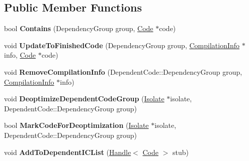 \subsection*{Public Member Functions}
\begin{DoxyCompactItemize}
\item 
\hypertarget{classv8_1_1internal_1_1_dependent_code_aef81cb78eaacbaad5015b73496506ce1}{}bool {\bfseries Contains} (Dependency\+Group group, \hyperlink{classv8_1_1internal_1_1_code}{Code} $\ast$code)\label{classv8_1_1internal_1_1_dependent_code_aef81cb78eaacbaad5015b73496506ce1}

\item 
\hypertarget{classv8_1_1internal_1_1_dependent_code_a6ca65e7e3557ddf9051ee09c0d70f3d8}{}void {\bfseries Update\+To\+Finished\+Code} (Dependency\+Group group, \hyperlink{classv8_1_1internal_1_1_compilation_info}{Compilation\+Info} $\ast$info, \hyperlink{classv8_1_1internal_1_1_code}{Code} $\ast$code)\label{classv8_1_1internal_1_1_dependent_code_a6ca65e7e3557ddf9051ee09c0d70f3d8}

\item 
\hypertarget{classv8_1_1internal_1_1_dependent_code_ad9df74a9e265aa0df7a405589af79a62}{}void {\bfseries Remove\+Compilation\+Info} (Dependent\+Code\+::\+Dependency\+Group group, \hyperlink{classv8_1_1internal_1_1_compilation_info}{Compilation\+Info} $\ast$info)\label{classv8_1_1internal_1_1_dependent_code_ad9df74a9e265aa0df7a405589af79a62}

\item 
\hypertarget{classv8_1_1internal_1_1_dependent_code_a7b464250df1b523af5da5685b0f403ec}{}void {\bfseries Deoptimize\+Dependent\+Code\+Group} (\hyperlink{classv8_1_1internal_1_1_isolate}{Isolate} $\ast$isolate, Dependent\+Code\+::\+Dependency\+Group group)\label{classv8_1_1internal_1_1_dependent_code_a7b464250df1b523af5da5685b0f403ec}

\item 
\hypertarget{classv8_1_1internal_1_1_dependent_code_a4b3a68aba1af3c6ea427ec412fa606ab}{}bool {\bfseries Mark\+Code\+For\+Deoptimization} (\hyperlink{classv8_1_1internal_1_1_isolate}{Isolate} $\ast$isolate, Dependent\+Code\+::\+Dependency\+Group group)\label{classv8_1_1internal_1_1_dependent_code_a4b3a68aba1af3c6ea427ec412fa606ab}

\item 
\hypertarget{classv8_1_1internal_1_1_dependent_code_ae00f794d5badfedd368042837df3d00c}{}void {\bfseries Add\+To\+Dependent\+I\+C\+List} (\hyperlink{classv8_1_1internal_1_1_handle}{Handle}$<$ \hyperlink{classv8_1_1internal_1_1_code}{Code} $>$ stub)\label{classv8_1_1internal_1_1_dependent_code_ae00f794d5badfedd368042837df3d00c}


\end{DoxyCompactItemize}
